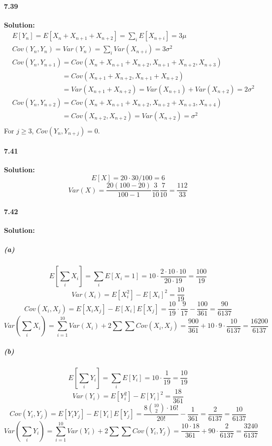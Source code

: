 \documentclass[11pt]{article}
\begin{document}
	\paragraph{7.39}\textbf{Solution:}
		\begin{align}
			&E[Y_n] = E[X_n + X_{n + 1} + X_{n+2}] = \sum_i E[X_{n + i}] = 3\mu\nonumber\\
			&Cov(Y_n, Y_n) = Var(Y_n) = \sum_i Var(X_{n + i}) = 3\sigma^2\nonumber\\
			&Cov(Y_n, Y_{n + 1}) = Cov(X_n + X_{n + 1} + X_{n + 2}, X_{n + 1} + X_{n + 2}, X_{n + 3})\nonumber\\
			&\phantom{Cov(Y_n, Y_{n + 1})} = Cov(X_{n + 1} + X_{n + 2}, X_{n + 1} + X_{n + 2})\nonumber\\
			&\phantom{Cov(Y_n, Y_{n + 1})} = Var(X_{n + 1} + X_{n + 2}) = Var(X_{n + 1}) + Var(X_{n + 2}) = 2\sigma^2\nonumber\\
			&Cov(Y_n, Y_{n + 2}) = Cov(X_n + X_{n + 1} + X_{n + 2}, X_{n + 2} + X_{n + 3}, X_{n + 4})\nonumber\\
			&\phantom{Cov(Y_n, Y_{n + 2})} = Cov(X_{n + 2}, X_{n + 2}) = Var(X_{n + 2}) = \sigma^2\nonumber\\
		\end{align}
		For $j \geq 3$, $Cov(Y_n, Y_{n + j}) = 0$.
	\paragraph{7.41}\textbf{Solution:}
		\[E[X] = 20\cdot 30/100 = 6\]
		\[Var(X) = \frac{20(100 - 20)}{100 - 1}\frac{3}{10}\frac{7}{10} = \frac{112}{33}\]
	\paragraph{7.42}\textbf{Solution:}
		\subparagraph{(a)}
			\[E[\sum_i X_i] = \sum_i E[X_i = 1] = 10 \cdot \frac{2\cdot 10 \cdot 10}{20 \cdot 19} = \frac{100}{19}\]
			\[Var(X_i) = E[X_i^2] - E[X_i]^2 = \frac{10}{19}\]
			\[Cov(X_i, X_j) = E[X_iX_j] - E[X_i]E[X_j] = \frac{10}{19}\cdot\frac{9}{17} - \frac{100}{361} = \frac{90}{6137}\]
			\[Var(\sum_i X_i) = \sum_{i = 1}^{10} Var(X_i)+ 2\sum\sum Cov(X_i, X_j) = \frac{900}{361} + 10\cdot 9 \cdot \frac{10}{6137} = \frac{16200}{6137}\]
		\subparagraph{(b)}
			\[E[\sum_i Y_i] = \sum_i E[Y_i] = 10 \cdot \frac{1}{19} = \frac{10}{19}\]
			\[Var(Y_i) = E[Y_i^2] - E[Y_i]^2 =  \frac{18}{361}\]
			\[Cov(Y_i, Y_j) = E[Y_iY_j] - E[Y_i]E[Y_j] = \frac{8\binom{10}{2}\cdot 16!}{20!} - \frac{1}{361} = \frac{2}{6137} = \frac{10}{6137}\]
			\[Var(\sum_i Y_i) = \sum_{i = 1}^{10} Var(Y_i)+ 2\sum\sum Cov(Y_i, Y_j) = \frac{10\cdot 18}{361} + 90 \cdot \frac{2}{6137} = \frac{3240}{6137}\]
\end{document}
